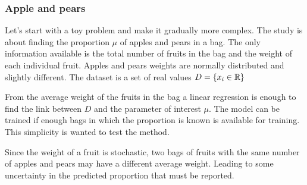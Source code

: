 \subsubsection{Apple and pears}

Let's start with a toy problem and make it gradually more complex.
The study is about finding the proportion $\mu$ of apples and pears in a bag.
The only information available is the total number of fruits in the bag and the weight of each individual fruit.
Apples and pears weights are normally distributed and slightly different.
The dataset is a set of real values $D = \{ x_i \in \mathbb{R} \} $

From the average weight of the fruits in the bag a linear regression is enough to find the link between $D$ and the parameter of interest $\mu$.
The model can be trained if enough bags in which the proportion is known is available for training.
This simplicity is wanted to test the method.

Since the weight of a fruit is stochastic, two bags of fruits with the same number of apples and pears may have a different average weight.
Leading to some uncertainty in the predicted proportion that must be reported.






